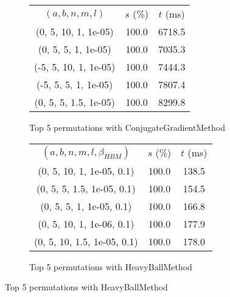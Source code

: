 \begin{figure}[H]
{\begin{subfigure}[ht]{.6\textwidth}
\begin{tabular}{|c|c|c|}
\hline
\rowcolor{gray!25}
\multicolumn{3}{|c|}{ConjugateGradientMethod} \\
\hline
\rowcolor{gray!25}
$(a,b,n,m,l)$ & $s$ (\%) & $t$ (ms) \\
\hline
(0, 5, 10, 1, 1e-05) & 100.0 & 6718.5 \\
(0, 5, 5, 1, 1e-05) & 100.0 & 7035.3 \\
(-5, 5, 10, 1, 1e-05) & 100.0 & 7444.3 \\
(-5, 5, 5, 1, 1e-05) & 100.0 & 7807.4 \\
(0, 5, 5, 1.5, 1e-05) & 100.0 & 8299.8 \\
\hline
\end{tabular}
\caption{Top 5 permutations with ConjugateGradientMethod}
\label{subfig:param_comp_NegativeEntropy_ConjugateGradientMethod_UniformSearch}
\end{subfigure}
\hfill
\begin{subfigure}[ht]{.6\textwidth}
\centering
{}
\begin{tabular}{|c|c|c|}
\hline
\rowcolor{gray!25}
\multicolumn{3}{|c|}{HeavyBallMethod} \\
\hline
\rowcolor{gray!25}
$(a,b,n,m,l,\beta_{HBM})$ & $s$ (\%) & $t$ (ms) \\
\hline
(0, 5, 10, 1, 1e-05, 0.1) & 100.0 & 138.5 \\
(0, 5, 5, 1.5, 1e-05, 0.1) & 100.0 & 154.5 \\
(0, 5, 5, 1, 1e-05, 0.1) & 100.0 & 166.8 \\
(0, 5, 10, 1, 1e-06, 0.1) & 100.0 & 177.9 \\
(0, 5, 10, 1.5, 1e-05, 0.1) & 100.0 & 178.0 \\
\hline
\end{tabular}
\caption{Top 5 permutations with HeavyBallMethod}
\label{subfig:param_comp_NegativeEntropy_HeavyBallMethod_UniformSearch}
\end{subfigure}
}
\end{figure}